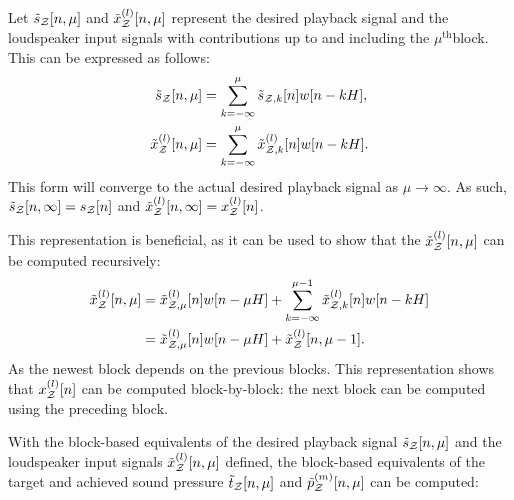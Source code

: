 Let $\tilde{s}_{\mathcal{Z}}[n, \mu]$ and $\tilde{x}^{(l)}_{\mathcal{Z}}[n, \mu]$ represent the desired playback signal and the loudspeaker input signals with contributions up to and including the $\mu^\mathrm{th}$block. 
This can be expressed as follows:
\begin{align}
    \tilde{s}_{\mathcal{Z}}[n, \mu] &= \sum_{k=-\infty}^{\mu} \tilde{s}_{\mathcal{Z},k}[n]w[n - kH], \\
    \tilde{x}^{(l)}_{\mathcal{Z}}[n, \mu] &= \sum_{k=-\infty}^{\mu} \tilde{x}^{(l)}_{\mathcal{Z},k}[n]w[n - kH].
\end{align}
This form will converge to the actual desired playback signal as $\mu\to\infty$.
As such, $\tilde{s}_{\mathcal{Z}}[n, \infty] = s_{\mathcal{Z}}[n]$ and $\tilde{x}^{(l)}_{\mathcal{Z}}[n, \infty] = x^{(l)}_{\mathcal{Z}}[n]$.

This representation is beneficial, as it can be used to show that the $\tilde{x}^{(l)}_{\mathcal{Z}}[n, \mu]$ can be computed recursively:
\begin{align}
    \begin{aligned}
    \tilde{x}^{(l)}_{\mathcal{Z}}[n, \mu] &= \tilde{x}^{(l)}_{\mathcal{Z},\mu}[n]w[n - \mu H] +
                               \sum_{k=-\infty}^{\mu - 1} \tilde{x}^{(l)}_{\mathcal{Z},k}[n]w[n - kH] \\
                           &=  \tilde{x}^{(l)}_{\mathcal{Z},\mu}[n]w[n - \mu H] + \tilde{x}^{(l)}_{\mathcal{Z}}[n, \mu - 1].
    \end{aligned}
\end{align}
As the newest block depends on the previous blocks. 
This representation shows that $x^{(l)}_{\mathcal{Z}}[n]$ can be computed block-by-block: the next block can be computed using the preceding block.

With the block-based equivalents of the desired playback signal $\tilde{s}_{\mathcal{Z}}[n, \mu]$ and the loudspeaker input signals $\tilde{x}^{(l)}_{\mathcal{Z}}[n, \mu]$ defined, the block-based equivalents of the target and achieved sound pressure $\tilde{t}_{\mathcal{Z}}[n, \mu]$ and $\tilde{p}^{(m)}_{\mathcal{Z}}[n, \mu]$ can be computed: 

